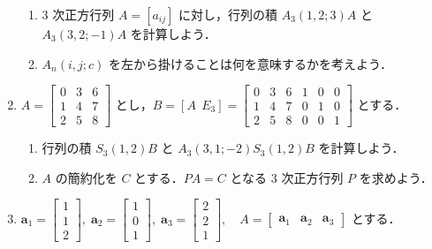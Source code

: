 \documentclass[11pt, uplatex, dvipdfmx]{jsarticle}
\begin{document}
\begin{enumerate}
\begin{enumerate}[(1)]
  \item $3$ 次正方行列 $A=\left[ a_{ij}\right]$ に対し，行列の積 $A_3(1,2; 3)A$ と $A_3(3,2; -1)A$ を計算しよう．

  \item $A_n(i,j; c)$ を左から掛けることは何を意味するかを考えよう．
  \end{enumerate}

\item $A=\left[
    \begin{array}{rrr}
      0 & 3 & 6\\
      1 & 4 & 7\\
      2 & 5 & 8
    \end{array}
  \right]$ とし，$B=\left[ A \  \ E_3\right] = \left[
    \begin{array}{rrrrrr}
      0 & 3 & 6 & 1 & 0 & 0\\
      1 & 4 & 7 & 0 & 1 & 0\\
      2 & 5 & 8 & 0 & 0 & 1
    \end{array}
  \right]$ とする．

  \vspace{1zh}

  \begin{enumerate}[(1)]
    \setlength{\itemsep}{1ex}
    
  \item 行列の積 $S_3(1,2) B$ と $A_3(3,1; -2) S_3(1,2)B$ を計算しよう．

  \item $A$ の簡約化を $C$ とする．$PA=C$ となる $3$ 次正方行列 $P$ を求めよう．
    
  \end{enumerate}
  
\item $\bm{a}_1=\left[
    \begin{array}{r}
      1\\
      1\\
      2
    \end{array}
  \right], \; \bm{a}_2=\left[
    \begin{array}{r}
      1\\
      0\\
      1
    \end{array}
  \right], \; \bm{a}_3=\left[
    \begin{array}{r}
      2\\
      2\\
      1
    \end{array}
  \right], \quad A=\left[
    \begin{array}{ccc}
      \bm{a}_1 & \bm{a}_2 & \bm{a}_3
    \end{array}
  \right]$ とする．


\end{enumerate}
\end{document}
